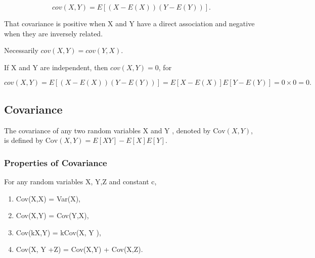 			\[ cov(X, Y ) = E[(X - E(X))(Y - E(Y ))].\]
			
			That covariance is positive when X and Y have a direct association and negative
			when they are inversely related.
			
			Necessarily $cov(X, Y ) = cov(Y,X)$.
			
			If X and Y are independent, then $cov(X, Y ) = 0$, for
			
			\[
			cov(X, Y ) = E[(X - E(X))(Y - E(Y ))]
			= E[X - E(X)]E[Y - E(Y )]= 0 \times 0 = 0.
			\]
			
		


\subsection{Covariance} The covariance of any two random
variables X and Y , denoted by $\mbox{Cov}(X,Y)$, is defined by
$\mbox{Cov}(X,Y) = E[XY] - E[X]E[Y]$.


\subsubsection{Properties of Covariance}
For any random variables X, Y,Z and constant c,
\begin{enumerate}\item \mbox{Cov}(X,X) = \mbox{Var}(X), \item
\mbox{Cov}(X,Y) = \mbox{Cov}(Y,X), \item \mbox{Cov}(kX,Y) =
\mbox{k}Cov(X, Y ), \item \mbox{Cov}(X, Y +Z) = \mbox{Cov}(X,Y) +
\mbox{Cov}(X,Z).\end{enumerate}

